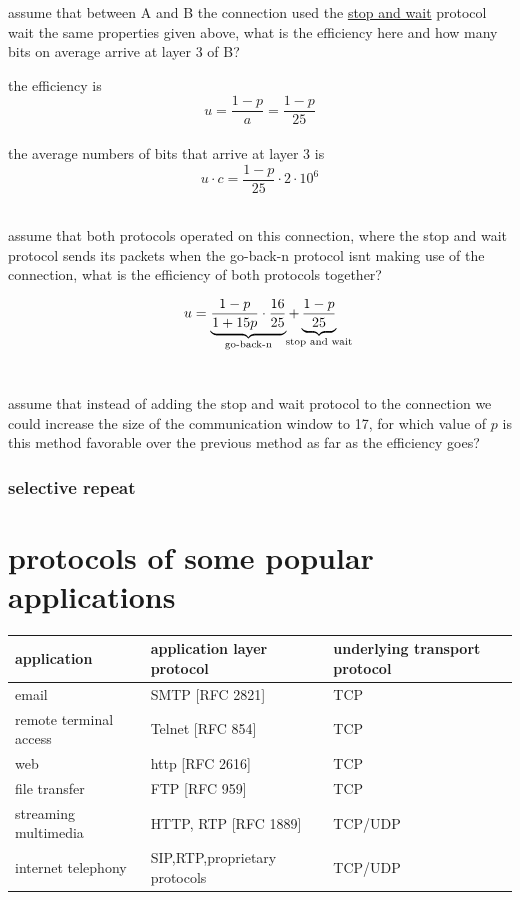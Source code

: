 \documentclass[a4paper,12pt]{article}
\begin{document}
\begin{question}
\begin{subquestion}
assume that between A and B the connection used the \hyperref[sec:orgfe37c48]{stop and wait} protocol wait the same properties given above, what is the efficiency here and how many bits on average arrive at layer 3 of B?\\
\begin{answer}
the efficiency is\\
\[
u = \frac{1-p}{a} = \frac{1-p}{25}
\]\\
the average numbers of bits that arrive at layer 3 is\\
\[
u \cdot c = \frac{1-p}{25} \cdot 2 \cdot 10^6
\]\\
\end{answer}
\end{subquestion}

\begin{subquestion}
assume that both protocols operated on this connection, where the stop and wait protocol sends its packets when the go-back-n protocol isnt making use of the connection, what is the efficiency of both protocols together?\\
\begin{answer}
\[
u = \underbrace{\frac{1-p}{1+15p} \cdot \frac{16}{25}}_{\text{go-back-n}} + \underbrace{\frac{1-p}{25}}_{\text{\clap{stop and wait}}}
\]\\
\end{answer}
\end{subquestion}

\begin{answer}
assume that instead of adding the stop and wait protocol to the connection we could increase the size of the communication window to 17, for which value of \(p\) is this method favorable over the previous method as far as the efficiency goes?\\
\end{answer}
\end{question}
\subsubsection{selective repeat}
\label{sec:orgd9f1eee}
\section{protocols of some popular applications}
\label{sec:org8077989}
\begin{center}
\begin{tabular}{lll}
application & application layer protocol & underlying transport protocol\\
\hline
email & SMTP [RFC 2821] & TCP\\
remote terminal access & Telnet [RFC 854] & TCP\\
web & http [RFC 2616] & TCP\\
file transfer & FTP [RFC 959] & TCP\\
streaming multimedia & HTTP, RTP [RFC 1889] & TCP/UDP\\
internet telephony & SIP,RTP,proprietary protocols & TCP/UDP\\
\end{tabular}
\end{center}
\end{document}
